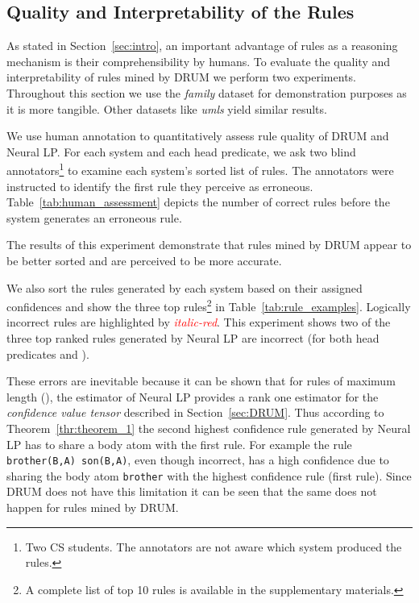 \documentclass{article}
\begin{document}
\subsection{Quality and Interpretability of the Rules}
\label{sec:rule_interpretability}

As stated in Section~\ref{sec:intro}, an important advantage of rules as a reasoning mechanism is their comprehensibility by humans. To evaluate the quality and interpretability of rules mined by DRUM we perform two experiments. Throughout this section we use the \textit{family} dataset for demonstration purposes as it is more tangible. Other datasets like \textit{umls} yield similar results.

\newlength{\oldintextsep}
\setlength{\oldintextsep}{\intextsep}
\setlength{\intextsep}{-11pt}\setlength{\columnsep}{10pt}We use human annotation to quantitatively assess rule quality of DRUM and Neural LP. For each system and each head predicate, we ask two blind annotators\footnote{Two CS students. The annotators are not aware which system produced the rules.} to examine each system's sorted list of rules. The annotators were instructed to identify the first rule they perceive as erroneous. Table~\ref{tab:human_assessment} depicts the number of correct rules before the system generates an erroneous rule.


\setlength{\intextsep}{\oldintextsep} The results of this experiment demonstrate that rules mined by DRUM appear to be better sorted and are perceived to be more accurate.

We also sort the rules generated by each system based on their assigned confidences and show the three top rules\footnote{A complete list of top 10 rules is available in the supplementary materials.} in Table~\ref{tab:rule_examples}. Logically incorrect rules are highlighted by \textit{\textcolor{red}{italic-red}}. This experiment shows two of the three top ranked rules generated by Neural LP are incorrect (for both head predicates  and ). 

These errors are inevitable because it can be shown that for rules of maximum length (), the estimator of Neural LP provides a rank one estimator for the \textit{confidence value tensor} described in Section~\ref{sec:DRUM}. Thus according to Theorem~\ref{thr:theorem_1} the second highest confidence rule generated by Neural LP has to share a body atom with the first rule. For example the rule \texttt{brother(B,A)  son(B,A)}, even though incorrect, has a high confidence due to sharing the body atom \texttt{brother} with the highest confidence rule (first rule). Since DRUM does not have this limitation it can be seen that the same does not happen for rules mined by DRUM.  
\end{document}
